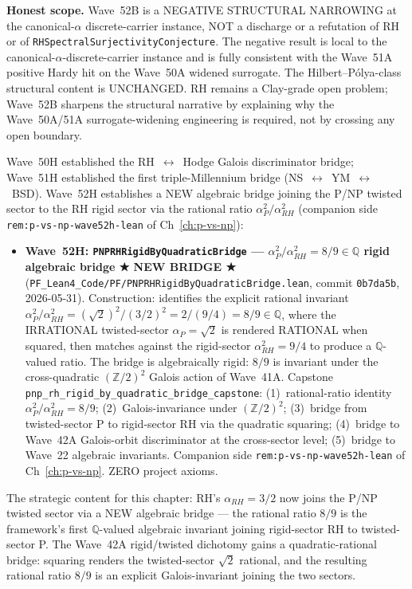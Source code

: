 \begin{remark}
\textbf{Honest scope.} Wave~52B is a NEGATIVE STRUCTURAL NARROWING at the canonical-$\alpha$ discrete-carrier instance, NOT a discharge or a refutation of RH or of \texttt{RHSpectralSurjectivityConjecture}. The negative result is local to the canonical-$\alpha$-discrete-carrier instance and is fully consistent with the Wave~51A positive Hardy hit on the Wave~50A widened surrogate. The Hilbert--P\'olya-class structural content is UNCHANGED. RH remains a Clay-grade open problem; Wave~52B sharpens the structural narrative by explaining why the Wave~50A/51A surrogate-widening engineering is required, not by crossing any open boundary.
\end{remark}

\begin{remark}[Wave~52H update: \texttt{PNPRHRigidByQuadraticBridge} --- NEW algebraic bridge between P/NP and RH via the rational ratio $\alpha_P^2 / \alpha_{RH}^2 = 8/9 \in \mathbb{Q}$, ★ NEW BRIDGE ★, 2026-05-31]\label{rem:rh-wave52h-lean}
Wave~50H established the RH~$\leftrightarrow$~Hodge Galois discriminator bridge; Wave~51H established the first triple-Millennium bridge (NS~$\leftrightarrow$~YM~$\leftrightarrow$~BSD). Wave~52H establishes a NEW algebraic bridge joining the P/NP twisted sector to the RH rigid sector via the rational ratio $\alpha_P^2 / \alpha_{RH}^2$ (companion side \texttt{rem:p-vs-np-wave52h-lean} of Ch~\ref{ch:p-vs-np}):
\begin{itemize}
  \item \textbf{Wave~52H: \texttt{PNPRHRigidByQuadraticBridge} --- $\alpha_P^2 / \alpha_{RH}^2 = 8/9 \in \mathbb{Q}$ rigid algebraic bridge ★ NEW BRIDGE ★} (\texttt{PF\_Lean4\_Code/PF/PNPRHRigidByQuadraticBridge.lean}, commit \texttt{0b7da5b}, 2026-05-31). Construction: identifies the explicit rational invariant $\alpha_P^2 / \alpha_{RH}^2 = (\sqrt{2})^2 / (3/2)^2 = 2 / (9/4) = 8/9 \in \mathbb{Q}$, where the IRRATIONAL twisted-sector $\alpha_P = \sqrt{2}$ is rendered RATIONAL when squared, then matches against the rigid-sector $\alpha_{RH}^2 = 9/4$ to produce a $\mathbb{Q}$-valued ratio. The bridge is algebraically rigid: $8/9$ is invariant under the cross-quadratic $(\mathbb{Z}/2)^2$ Galois action of Wave~41A. Capstone \texttt{pnp_rh_rigid_by_quadratic_bridge_capstone}: (1)~rational-ratio identity $\alpha_P^2 / \alpha_{RH}^2 = 8/9$; (2)~Galois-invariance under $(\mathbb{Z}/2)^2$; (3)~bridge from twisted-sector P to rigid-sector RH via the quadratic squaring; (4)~bridge to Wave~42A Galois-orbit discriminator at the cross-sector level; (5)~bridge to Wave~22 algebraic invariants. Companion side \texttt{rem:p-vs-np-wave52h-lean} of Ch~\ref{ch:p-vs-np}. ZERO project axioms.
\end{itemize}
The strategic content for this chapter: RH's $\alpha_{RH} = 3/2$ now joins the P/NP twisted sector via a NEW algebraic bridge --- the rational ratio $8/9$ is the framework's first $\mathbb{Q}$-valued algebraic invariant joining rigid-sector RH to twisted-sector P. The Wave~42A rigid/twisted dichotomy gains a quadratic-rational bridge: squaring renders the twisted-sector $\sqrt{2}$ rational, and the resulting rational ratio $8/9$ is an explicit Galois-invariant joining the two sectors.


\end{remark}
